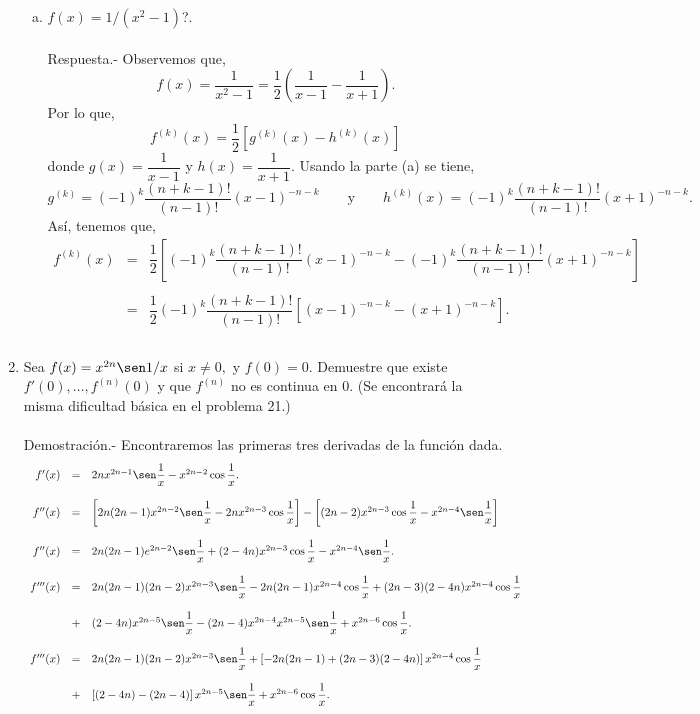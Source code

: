 \begin{enumerate}[\bfseries 1.]
\begin{enumerate}[(a)]
	    \item $f(x)=1/(x^2-1)$?.\\\\
		Respuesta.-\; Observemos que,
		$$f(x)=\dfrac{1}{x^2-1}=\dfrac{1}{2}\left(\dfrac{1}{x-1}-\dfrac{1}{x+1}\right).$$
		Por lo que,
		$$f^{(k)}(x)=\dfrac{1}{2}\left[g^{(k)}(x)-h^{(k)}(x)\right]$$
		donde $g(x)=\dfrac{1}{x-1}$ y $h(x)=\dfrac{1}{x+1}$. Usando la parte (a) se tiene,
		$$g^{(k)}=(-1)^k \dfrac{(n+k-1)!}{(n-1)!}(x-1)^{-n-k} \qquad \mbox{y}\qquad h^{(k)}(x)=(-1)^k \dfrac{(n+k-1)!}{(n-1)!}(x+1)^{-n-k}.$$
		Así, tenemos que,
		$$\begin{array}{rcl}
		    f^{(k)}(x)&=&\dfrac{1}{2}\left[(-1)^k \dfrac{(n+k-1)!}{(n-1)!}(x-1)^{-n-k}-(-1)^k \dfrac{(n+k-1)!}{(n-1)!}(x+1)^{-n-k}\right]\\\\
			      &=&\dfrac{1}{2}(-1)^k \dfrac{(n+k-1)!}{(n-1)!}\left[(x-1)^{-n-k}-(x+1)^{-n-k}\right].\\\\
		\end{array}$$
		\vspace{.5cm}

	 \end{enumerate}

     \item Sea $f(x)=x^{2n}\sen 1/x$ si $x\neq 0,$ y $f(0)=0$. Demuestre que existe $f'(0),\ldots , f^{(n)}(0)$ y que $f^{(n)}$ no es continua en $0$. (Se encontrará la misma dificultad básica en el problema 21.)\\\\
	 Demostración.-\; Encontraremos las primeras tres derivadas de la función dada.
	 $$\begin{array}{rcl}
	     f'(x)&=&2nx^{2n-1}\sen\dfrac{1}{x}-x^{2n-2}\cos\dfrac{1}{x}.\\\\
	     f''(x)&=&\left[2n(2n-1)x^{2n-2}\sen \dfrac{1}{x}-2nx^{2n-3}\cos \dfrac{1}{x}\right]-\left[(2n-2)x^{2n-3}\cos \dfrac{1}{x}-x^{2n-4}\sen\dfrac{1}{x}\right]\\\\
	     f''(x)&=&2n(2n-1)e^{2n-2}\sen \dfrac{1}{x}+(2-4n)x^{2n-3}\cos \dfrac{1}{x}-x^{2n-4}\sen \dfrac{1}{x}.\\\\
	     f'''(x) &=& 2n(2n-1)(2n-2)x^{2n-3}\sen \dfrac{1}{x}-2n(2n-1)x^{2n-4}\cos \dfrac{1}{x} + (2n-3)(2-4n)x^{2n-4}\cos \dfrac{1}{x}\\\\
		     &+&(2-4n)x^{2n-5}\sen \dfrac{1}{x}-(2n-4)x^{2n-4}x^{2n-5}\sen \dfrac{1}{x}+x^{2n-6}\cos \dfrac{1}{x}.\\\\
	     f'''(x)&=&2n(2n-1)(2n-2)x^{2n-3}\sen \dfrac{1}{x}+\left[-2n(2n-1)+(2n-3)(2-4n)\right]x^{2n-4}\cos \dfrac{1}{x}\\\\
		    &+&\left[(2-4n)-(2n-4)\right]x^{2n-5}\sen \dfrac{1}{x}+x^{2n-6}\cos \dfrac{1}{x}.\\\\
	 \end{array}$$


\end{enumerate}
